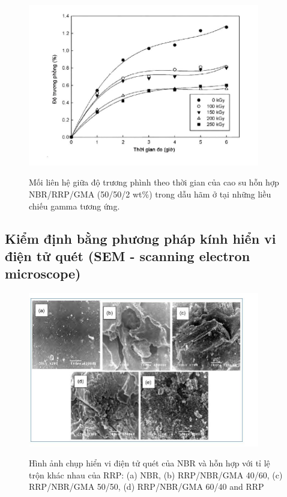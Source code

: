 \documentclass[12pt,a4paper]{article}
\begin{document}
		
		
		
		\begin{figure}
			\centering
			\includegraphics[width=0.9\textwidth]{13.JPG}
			\label{fig:HINH_11}
			\caption{Mối liên hệ giữa độ trương phình theo thời gian của cao su hỗn hợp NBR/RRP/GMA (50/50/2 wt\%) trong dẫu hãm ở tại những liều chiếu gamma tương ứng.}
		\end{figure}
		
	
	\subsection{Kiểm định bằng phương pháp kính hiển vi điện tử quét (SEM - scanning electron microscope)}
	
	\begin{figure}
			\centering
			\includegraphics[width=0.9\textwidth]{14.JPG}
			\label{fig:HINH_12}
			\caption{Hình ảnh chụp hiển vi điện tử quét của NBR và hỗn hợp với tỉ lệ trộn khác nhau của RRP: (a) NBR, (b) RRP/NBR/GMA 40/60, (c) RRP/NBR/GMA 50/50, (d) RRP/NBR/GMA 60/40 and RRP}
	\end{figure}	
		
\end{document}
